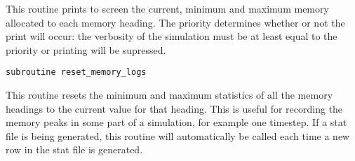 \documentclass[a4paper, 11pt]{book}
\begin{document}
This routine prints to screen the current, minimum and maximum memory
allocated to each memory heading. The priority determines whether or not the
print will occur: the verbosity of the simulation must be at least equal to
the priority or printing will be supressed.


\begin{lstlisting}
subroutine reset_memory_logs  
\end{lstlisting}

This routine resets the minimum and maximum statistics of all the memory
headings to the current value for that heading. This is useful for recording
the memory peaks in some part of a simulation, for example one timestep. If
 a stat file is being generated, this routine will automatically be called
 each time a new row in the stat file is generated.
\end{document}
